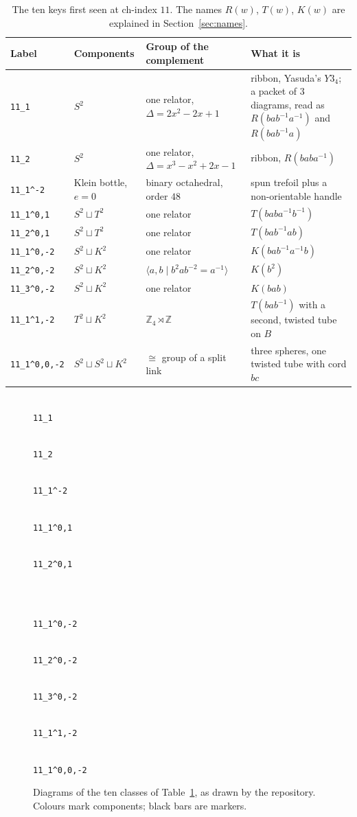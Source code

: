 \documentclass[11pt]{amsart}
\newcommand{\Z}{\mathbb{Z}}
\newcommand{\lab}[1]{\texttt{#1}}
\newcommand{\inv}{^{-1}}
\theoremstyle{plain}
\theoremstyle{remark}
\begin{document}
\begin{table}[ht]
\centering
\small
\begin{tabular}{@{}lp{}p{}p{}@{}}
\toprule
Label & Components & Group of the complement & What it is \\
\midrule
\lab{11\_1} & $S^2$ & one relator, $\Delta=2x^2-2x+1$ & ribbon, Yasuda's $Y3_4$; a packet of $3$ diagrams, read as $R(bab\inv a\inv)$ and $R(bab\inv a)$ \\
\lab{11\_2} & $S^2$ & one relator, $\Delta=x^3-x^2+2x-1$ & ribbon, $R(baba\inv)$ \\
\lab{11\_1\^{}-2} & Klein bottle, $e=0$ & binary octahedral, order $48$ & spun trefoil plus a non-orientable handle \\
\lab{11\_1\^{}0,1} & $S^2\sqcup T^2$ & one relator & $T(baba\inv b\inv)$ \\
\lab{11\_2\^{}0,1} & $S^2\sqcup T^2$ & one relator & $T(bab\inv ab)$ \\
\lab{11\_1\^{}0,-2} & $S^2\sqcup K^2$ & one relator & $K(bab\inv a\inv b)$ \\
\lab{11\_2\^{}0,-2} & $S^2\sqcup K^2$ & $\langle a,b \mid b^{2}ab^{-2}=a^{-1}\rangle$ & $K(b^2)$ \\
\lab{11\_3\^{}0,-2} & $S^2\sqcup K^2$ & one relator & $K(bab)$ \\
\lab{11\_1\^{}1,-2} & $T^2\sqcup K^2$ & $\Z_4\rtimes\Z$ & $T(bab\inv)$ with a second, twisted tube on $B$ \\
\lab{11\_1\^{}0,0,-2} & $S^2\sqcup S^2\sqcup K^2$ & $\cong$ group of a split link & three spheres, one twisted tube with cord $bc$ \\
\bottomrule
\end{tabular}
\caption{The ten keys first seen at ch-index $11$. The names $R(w)$, $T(w)$, $K(w)$ are explained in
Section~\ref{sec:names}.}
\label{tab:11}
\end{table}

\begin{figure}[ht]
\centering
\newcommand{\gal}[2]{\begin{minipage}[t]{0.19\textwidth}\centering
  \\[-2pt]{\scriptsize\lab{#2}}\end{minipage}}
\gal{11_1}{11\_1}\hfill\gal{11_2}{11\_2}\hfill\gal{11_1_sup_m2}{11\_1\^{}-2}\hfill
\gal{11_1_sup_0_1}{11\_1\^{}0,1}\hfill\gal{11_2_sup_0_1}{11\_2\^{}0,1}\\[8pt]
\gal{11_1_sup_0_m2}{11\_1\^{}0,-2}\hfill\gal{11_2_sup_0_m2}{11\_2\^{}0,-2}\hfill
\gal{11_3_sup_0_m2}{11\_3\^{}0,-2}\hfill\gal{11_1_sup_1_m2}{11\_1\^{}1,-2}\hfill
\gal{11_1_sup_0_0_m2}{11\_1\^{}0,0,-2}
\caption{Diagrams of the ten classes of Table~\ref{tab:11}, as drawn by the repository. Colours mark
components; black bars are markers.}
\label{fig:gallery}
\end{figure}
\end{document}
